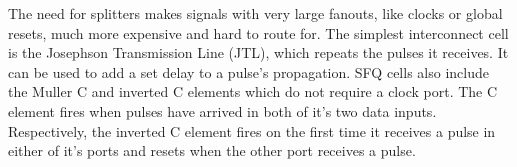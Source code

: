 The need for splitters makes signals with very large fanouts, like clocks or global resets, much more expensive and hard to route for.
The simplest interconnect cell is the Josephson Transmission Line (JTL), which repeats the pulses it receives.
It can be used to add a set delay to a pulse's propagation.
SFQ cells also include the Muller C and inverted C elements which do not require a clock port.
The C element fires when pulses have arrived in both of it's two data inputs.
Respectively, the inverted C element fires on the first time it receives a pulse in either of it's ports and resets when the other port receives a pulse.



